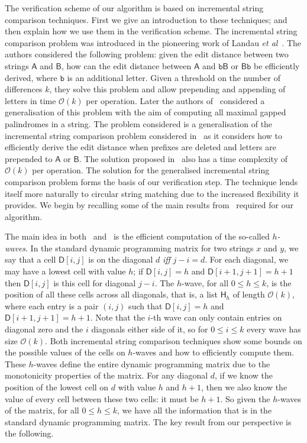 \documentclass[runningheads, envcountsame, a4paper]{llncs}\usepackage{etex}
\newcommand{\cO}{\mathcal{O}}
\begin{document}
The verification scheme of our algorithm is based on incremental string comparison techniques. 
First we give an introduction to these techniques; and then explain how we use them in the verification scheme.
The incremental string comparison problem was introduced in the pioneering work of Landau {\em et al}~\cite{LMS98}. 
The authors considered the following problem: given the edit distance between two strings $\textsf{A}$ and $\textsf{B}$, 
how can the edit distance between $\textsf{A}$ and $\texttt{b}\textsf{B}$ or $\textsf{B}\texttt{b}$ be efficiently derived, where $\texttt{b}$ is an additional letter. 
Given a threshold on the number of differences $k$, they solve this problem and allow prepending and appending of letters in time $\cO(k)$ per operation. 
Later the authors of~\cite{Hsu:2009:FAG:1696924.1697033} considered a generalisation of this problem with the aim of computing all maximal gapped palindromes in a string. 
The problem considered is a generalisation of the incremental string comparison problem considered in~\cite{LMS98} as it considers how to efficiently derive the edit distance when prefixes are deleted and letters are prepended to $\textsf{A}$ or $\textsf{B}$. The solution proposed in~\cite{Hsu:2009:FAG:1696924.1697033} also has a 
time complexity of $\cO(k)$ per operation. 
The solution for the generalised incremental string comparison problem forms the basis of our verification step. The technique lends itself more naturally to circular string matching due to the increased flexibility it provides. We begin by recalling some of the main results from~\cite{Hsu:2009:FAG:1696924.1697033} required for our algorithm.

The main idea in both~\cite{LMS98} and~\cite{Hsu:2009:FAG:1696924.1697033} is the efficient computation of the so-called \textit{$h$-waves}. 
In the standard dynamic programming matrix for two strings $x$ and $y$, we say that a cell $\textsf{D}[i,j]$ is on the diagonal $d$ {\em iff} $j-i=d$. For each diagonal, we may have a lowest cell with value $h$; if $\textsf{D}[i,j] = h$ and $\textsf{D}[i+1,j+1] = h+1$ then $\textsf{D}[i,j]$ is this cell for diagonal $j-i$. The $h$-wave, for all $0 \leq h \leq k$, is the position of all these cells across all diagonals, that is, a list $\textsf{H}_h$ of length $\cO(k)$, where each entry is a pair $(i,j)$ such that $\textsf{D}[i,j] = h$ and $\textsf{D}[i+1,j+1] = h+1$. Note that the $i$-th wave can only contain entries on diagonal zero and the $i$ diagonals either side of it, so for $0 \leq i \leq k$ every wave has size $\cO(k)$. 
Both incremental string comparison techniques show some bounds on the possible values of the cells on $h$-waves and how to 
efficiently compute them. 
These $h$-waves define the entire dynamic programming matrix due to the monotonicity properties of the matrix. For any diagonal $d$, if we know the position of the lowest cell on $d$ with 
value $h$ and $h+1$, then we also know the value of every cell between these two cells: it must be $h+1$. So given the $h$-waves of the matrix, for all $0 \leq h \leq k$, we have all the information that is in the standard dynamic programming matrix. The key result from our perspective is the following.
\end{document}
